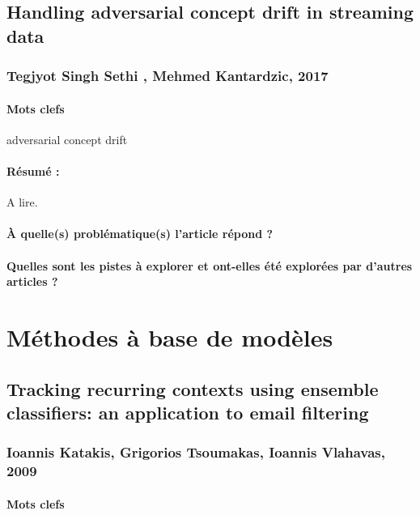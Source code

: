 \documentclass[11pt,a4paper]{report}
\begin{document}
\subsection{Handling adversarial concept drift in streaming data}
\subsubsection{Tegjyot Singh Sethi , Mehmed Kantardzic, 2017}

\paragraph{Mots clefs}  adversarial concept drift 

\paragraph{Résumé :} A lire.

\paragraph{À quelle(s) problématique(s) l'article répond ?}

\paragraph{Quelles sont les pistes à explorer et ont-elles  été explorées par d'autres articles ?}







\newpage







\section{Méthodes à base de modèles}
\subsection{Tracking recurring contexts using ensemble classifiers: an application to email filtering}
\subsubsection{Ioannis Katakis, Grigorios Tsoumakas, Ioannis Vlahavas, 2009}

\paragraph{Mots clefs}
\end{document}

